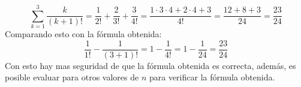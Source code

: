 \documentclass[a4paper]{article}
\begin{document}
\begin{enumerate}
\begin{enumerate}
            \begin{equation*}
                \sum_{k=1}^{3} \frac{k}{\left(k+1\right)!} = \frac{1}{2!} + \frac{2}{3!} + \frac{3}{4!} = \frac{1\cdot 3 \cdot 4 + 2\cdot 4 + 3}{4!}= \frac{12+8+3}{24}= \frac{23}{24}
            \end{equation*}
            Comparando esto con la fórmula obtenida:
            \begin{equation*}
                \frac{1}{1!} - \frac{1}{\left(3+1\right)!} = 1 - \frac{1}{4!} = 1 - \frac{1}{24} = \frac{23}{24}
            \end{equation*}
            Con esto hay mas seguridad de que la fórmula obtenida es correcta, además, es posible evaluar para otros valores de $n$ para verificar la fórmula obtenida.
        \end{enumerate}
\end{enumerate}
\end{document}
